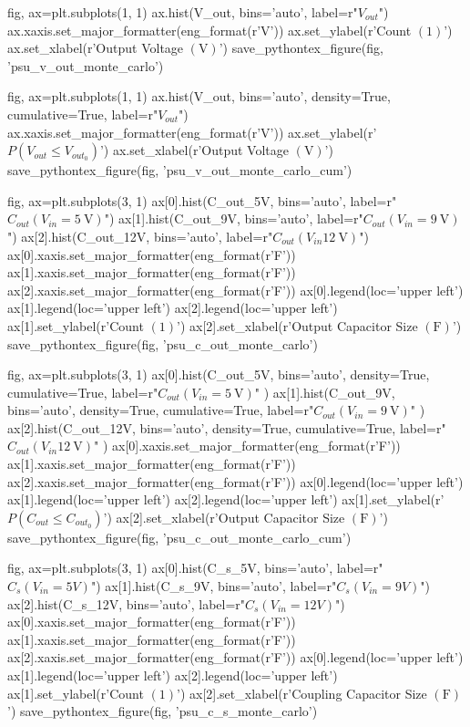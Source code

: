 \documentclass[12pt, titlepage]{/home/air/projects/latex-template/tex-template}
\begin{document}
\begin{pycode}
fig, ax=plt.subplots(1, 1)
ax.hist(V_out, bins='auto', label=r"$V_{out}$")
ax.xaxis.set_major_formatter(eng_format(r'\unit{\volt}'))
ax.set_ylabel(r'Count $\left(1\right)$')
ax.set_xlabel(r'Output Voltage $\left(\unit{\volt}\right)$')
save_pythontex_figure(fig, 'psu_v_out_monte_carlo')

fig, ax=plt.subplots(1, 1)
ax.hist(V_out, bins='auto', density=True, cumulative=True, label=r"$V_{out}$")
ax.xaxis.set_major_formatter(eng_format(r'\unit{\volt}'))
ax.set_ylabel(r'$P\left(V_{out} \leq V_{out_0}\right)$')
ax.set_xlabel(r'Output Voltage $\left(\unit{\volt}\right)$')
save_pythontex_figure(fig, 'psu_v_out_monte_carlo_cum')

fig, ax=plt.subplots(3, 1)
ax[0].hist(C_out_5V, bins='auto', label=r"$C_{out}(V_{in}=\SI{5}{\volt})$")
ax[1].hist(C_out_9V, bins='auto', label=r"$C_{out}(V_{in}=\SI{9}{\volt})$")
ax[2].hist(C_out_12V, bins='auto', label=r"$C_{out}(V_{in}\SI{12}{\volt})$")
ax[0].xaxis.set_major_formatter(eng_format(r'\unit{\farad}'))
ax[1].xaxis.set_major_formatter(eng_format(r'\unit{\farad}'))
ax[2].xaxis.set_major_formatter(eng_format(r'\unit{\farad}'))
ax[0].legend(loc='upper left')
ax[1].legend(loc='upper left')
ax[2].legend(loc='upper left')
ax[1].set_ylabel(r'Count $\left(1\right)$')
ax[2].set_xlabel(r'Output Capacitor Size $\left(\unit{\farad}\right)$')
save_pythontex_figure(fig, 'psu_c_out_monte_carlo')

fig, ax=plt.subplots(3, 1)
ax[0].hist(C_out_5V, bins='auto', density=True, cumulative=True,
           label=r"$C_{out}(V_{in}=\SI{5}{\volt})$"
           )
ax[1].hist(C_out_9V, bins='auto', density=True, cumulative=True,
           label=r"$C_{out}(V_{in}=\SI{9}{\volt})$"
           )
ax[2].hist(C_out_12V, bins='auto', density=True, cumulative=True,
           label=r"$C_{out}(V_{in}\SI{12}{\volt})$"
           )
ax[0].xaxis.set_major_formatter(eng_format(r'\unit{\farad}'))
ax[1].xaxis.set_major_formatter(eng_format(r'\unit{\farad}'))
ax[2].xaxis.set_major_formatter(eng_format(r'\unit{\farad}'))
ax[0].legend(loc='upper left')
ax[1].legend(loc='upper left')
ax[2].legend(loc='upper left')
ax[1].set_ylabel(r'$P\left(C_{out} \leq C_{out_0}\right)$')
ax[2].set_xlabel(r'Output Capacitor Size $\left(\unit{\farad}\right)$')
save_pythontex_figure(fig, 'psu_c_out_monte_carlo_cum')

fig, ax=plt.subplots(3, 1)
ax[0].hist(C_s_5V, bins='auto', label=r"$C_{s}(V_{in}=5V)$")
ax[1].hist(C_s_9V, bins='auto', label=r"$C_{s}(V_{in}=9V)$")
ax[2].hist(C_s_12V, bins='auto', label=r"$C_{s}(V_{in}=12V)$")
ax[0].xaxis.set_major_formatter(eng_format(r'\unit{\farad}'))
ax[1].xaxis.set_major_formatter(eng_format(r'\unit{\farad}'))
ax[2].xaxis.set_major_formatter(eng_format(r'\unit{\farad}'))
ax[0].legend(loc='upper left')
ax[1].legend(loc='upper left')
ax[2].legend(loc='upper left')
ax[1].set_ylabel(r'Count $\left(1\right)$')
ax[2].set_xlabel(r'Coupling Capacitor Size $\left(\unit{\farad}\right)$')
save_pythontex_figure(fig, 'psu_c_s_monte_carlo')


\end{pycode}
\end{document}
